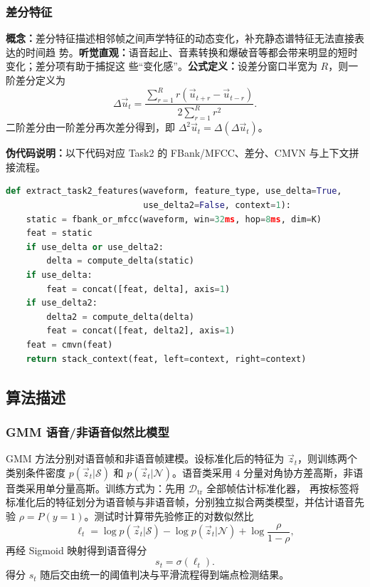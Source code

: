 \documentclass[a4paper]{article}
\begin{document}
\subsubsection{差分特征}

\textbf{概念：}差分特征描述相邻帧之间声学特征的动态变化，补充静态谱特征无法直接表达的时间趋
势。\textbf{听觉直观：}语音起止、音素转换和爆破音等都会带来明显的短时变化；差分项有助于捕捉这
些“变化感”。\textbf{公式定义：}设差分窗口半宽为 $R$，则一阶差分定义为
\begin{equation}
  \Delta \vec{u}_t =
  \frac{\sum_{r=1}^{R} r(\vec{u}_{t+r}-\vec{u}_{t-r})}
       {2\sum_{r=1}^{R}r^2}.
\end{equation}
二阶差分由一阶差分再次差分得到，即 $\Delta^2\vec{u}_t=\Delta(\Delta\vec{u}_t)$。

\textbf{伪代码说明：}以下代码对应 Task2 的 FBank/MFCC、差分、CMVN 与上下文拼接流程。

\begin{lstlisting}[language=python]
def extract_task2_features(waveform, feature_type, use_delta=True,
                           use_delta2=False, context=1):
    static = fbank_or_mfcc(waveform, win=32ms, hop=8ms, dim=K)
    feat = static
    if use_delta or use_delta2:
        delta = compute_delta(static)
    if use_delta:
        feat = concat([feat, delta], axis=1)
    if use_delta2:
        delta2 = compute_delta(delta)
        feat = concat([feat, delta2], axis=1)
    feat = cmvn(feat)
    return stack_context(feat, left=context, right=context)
\end{lstlisting}

\subsection{算法描述}

\subsubsection{GMM 语音/非语音似然比模型}

GMM 方法分别对语音帧和非语音帧建模。设标准化后的特征为 $\vec{z}_t$，则训练两个类别条件密度
$p(\vec{z}_t|\mathcal{S})$ 和 $p(\vec{z}_t|\mathcal{N})$。语音类采用 $4$ 分量对角协方差高斯，非语音类采用单分量高斯。训练方式为：先用 $\mathcal{D}_{\text{tr}}$ 全部帧估计标准化器，
再按标签将标准化后的特征划分为语音帧与非语音帧，分别独立拟合两类模型，并估计语音先验
$\rho=P(y=1)$。测试时计算带先验修正的对数似然比
\begin{equation}
  \ell_t =
  \log p(\vec{z}_t|\mathcal{S})
  - \log p(\vec{z}_t|\mathcal{N})
  + \log \frac{\rho}{1-\rho},
\end{equation}
再经 Sigmoid 映射得到语音得分
\begin{equation}
  s_t = \sigma(\ell_t).
\end{equation}
得分 $s_t$ 随后交由统一的阈值判决与平滑流程得到端点检测结果。
\end{document}
